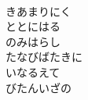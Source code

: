 \documentclass[10pt,b5j]{tarticle} %
\begin{document}
\begin{enumerate}
\begin{minipage}[c]{\blocksize}
    \end{minipage}
    \begin{minipage}[c]{\blocksize}
        
        \vspace{\linespace}
        \item~\\
        きあまりにく\\
        ととにはる\\
        のみはらし\\
        たなびばたきに\\
        いなるえて\\
        びたんいざの
    
    \end{minipage}
\end{enumerate} %
\end{document}
